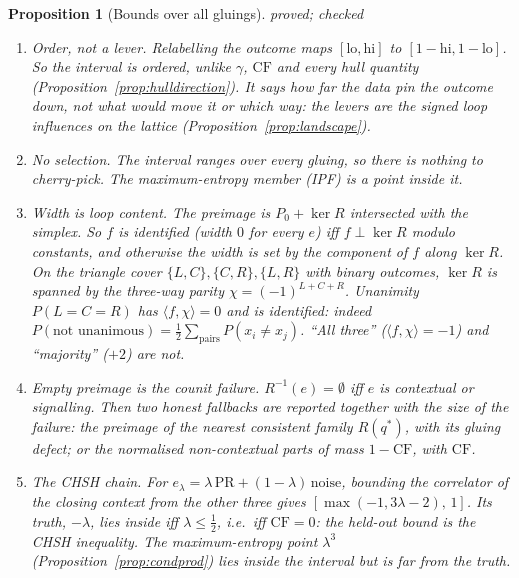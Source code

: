 \documentclass[11pt]{article}
\newtheorem{proposition}[theorem]{Proposition}
\theoremstyle{definition}
\theoremstyle{remark}
\newcommand{\CF}{\mathrm{CF}}
\newcommand{\st}[1]{\textsf{\small\color{gray}#1}}
\begin{document}
\begin{proposition}[Bounds over all gluings]\label{prop:bounds}\st{proved; checked}
\leavevmode
\begin{enumerate}
  \item \emph{Order, not a lever.} Relabelling the outcome maps $[\mathrm{lo},\mathrm{hi}]$ to $[1-\mathrm{hi},1-\mathrm{lo}]$. So the interval is ordered, unlike $\gamma$, $\CF$ and every hull quantity (Proposition~\ref{prop:hulldirection}). It says how far the data pin the outcome down, not what would move it or which way: the levers are the signed loop influences on the lattice (Proposition~\ref{prop:landscape}).
  \item \emph{No selection.} The interval ranges over every gluing, so there is nothing to cherry-pick. The maximum-entropy member (IPF) is a point inside it.
  \item \emph{Width is loop content.} The preimage is $P_0+\ker R$ intersected with the simplex. So $f$ is \emph{identified} (width $0$ for every $e$) iff $f\perp\ker R$ modulo constants, and otherwise the width is set by the component of $f$ along $\ker R$. On the triangle cover $\{L,C\},\{C,R\},\{L,R\}$ with binary outcomes, $\ker R$ is spanned by the three-way parity $\chi=(-1)^{L+C+R}$. Unanimity $P(L=C=R)$ has $\langle f,\chi\rangle=0$ and is identified: indeed $P(\text{not unanimous})=\tfrac12\sum_{\text{pairs}}P(x_i\ne x_j)$. ``All three'' ($\langle f,\chi\rangle=-1$) and ``majority'' ($+2$) are not.
  \item \emph{Empty preimage is the counit failure.} $R^{-1}(e)=\emptyset$ iff $e$ is contextual or signalling. Then two honest fallbacks are reported together with the size of the failure: the preimage of the nearest consistent family $R(q^\ast)$, with its gluing defect; or the normalised non-contextual parts of mass $1-\CF$, with $\CF$.
  \item \emph{The CHSH chain.} For $e_\lambda=\lambda\,\mathrm{PR}+(1-\lambda)\,\mathrm{noise}$, bounding the correlator of the closing context from the other three gives $[\max(-1,3\lambda-2),\,1]$. Its truth, $-\lambda$, lies inside iff $\lambda\le\tfrac12$, i.e.\ iff $\CF=0$: the held-out bound \emph{is} the CHSH inequality. The maximum-entropy point $\lambda^3$ (Proposition~\ref{prop:condprod}) lies inside the interval but is far from the truth.
\end{enumerate}
\end{proposition}
\end{document}
